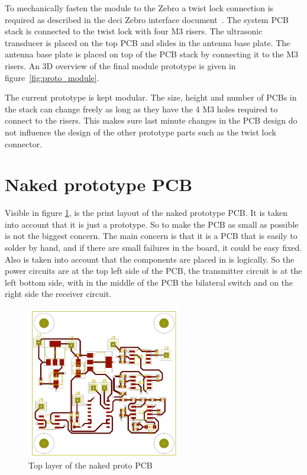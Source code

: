 To mechanically fasten the module to the Zebro a twist lock connection is required as described in the deci Zebro interface document~\cite{DeciSpecs}.
The system PCB stack is connected to the twist lock with four M3 risers.
The ultrasonic transducer is placed on the top PCB and slides in the antenna base plate.
The antenna base plate is placed on top of the PCB stack by connecting it to the M3 risers.
An 3D overview of the final module prototype is given in figure~\ref{fig:proto_module}.

The current prototype is kept modular.
The size, height and number of PCBs in the stack can change freely as long as they have the 4 M3 holes required to connect to the risers.
This makes sure last minute changes in the PCB design do not influence the design of the other prototype parts such as the twist lock connector.

\section{Naked prototype PCB}

 Visible in figure \ref{fig:naked_pcb}, is the print layout of the naked prototype PCB. It is taken into account that it is just a prototype. So to make the PCB as small as possible is not the biggest concern. The main concern is that it is a PCB that is easily to solder by hand, and if there are small failures in the board, it could be easy fixed. Also is taken into account that the components are placed in is logically. So the power circuits are at the top left side of the PCB, the transmitter circuit is at the left bottom side, with in the middle of the PCB the bilateral switch and on the right side the receiver circuit.

\begin{figure}[H]
\centering
\includegraphics[width=0.6\textwidth]{Figures/Total_circuit.png}
\caption{Top layer of the naked proto PCB}
\label{fig:naked_pcb}
\end{figure}


